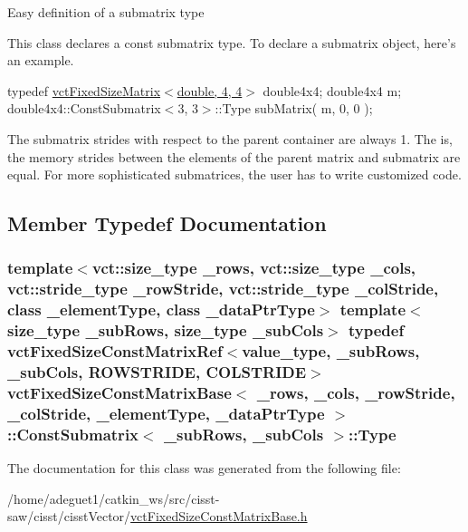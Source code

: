 Easy definition of a submatrix type

This class declares a const submatrix type. To declare a submatrix object, here's an example.

typedef \hyperlink{classvct_fixed_size_matrix}{vct\-Fixed\-Size\-Matrix$<$double, 4, 4$>$} double4x4; double4x4 m; double4x4\-::\-Const\-Submatrix$<$3, 3$>$\-::\-Type sub\-Matrix( m, 0, 0 );

The submatrix strides with respect to the parent container are always 1. The is, the memory strides between the elements of the parent matrix and submatrix are equal. For more sophisticated submatrices, the user has to write customized code. 

\subsection{Member Typedef Documentation}
\hypertarget{classvct_fixed_size_const_matrix_base_1_1_const_submatrix_a274c4b7ec1c81155c412da08ab1e1f41}{
\subsubsection[{Type}]{\setlength{\rightskip}{0pt plus 5cm}template$<$vct\-::size\-\_\-type \-\_\-rows, vct\-::size\-\_\-type \-\_\-cols, vct\-::stride\-\_\-type \-\_\-row\-Stride, vct\-::stride\-\_\-type \-\_\-col\-Stride, class \-\_\-element\-Type, class \-\_\-data\-Ptr\-Type$>$ template$<$size\-\_\-type \-\_\-sub\-Rows, size\-\_\-type \-\_\-sub\-Cols$>$ typedef {\bf vct\-Fixed\-Size\-Const\-Matrix\-Ref}$<$value\-\_\-type, \-\_\-sub\-Rows, \-\_\-sub\-Cols, {\bf R\-O\-W\-S\-T\-R\-I\-D\-E}, {\bf C\-O\-L\-S\-T\-R\-I\-D\-E}$>$ {\bf vct\-Fixed\-Size\-Const\-Matrix\-Base}$<$ \-\_\-rows, \-\_\-cols, \-\_\-row\-Stride, \-\_\-col\-Stride, \-\_\-element\-Type, \-\_\-data\-Ptr\-Type $>$\-::{\bf Const\-Submatrix}$<$ \-\_\-sub\-Rows, \-\_\-sub\-Cols $>$\-::{\bf Type}}}\label{classvct_fixed_size_const_matrix_base_1_1_const_submatrix_a274c4b7ec1c81155c412da08ab1e1f41}


The documentation for this class was generated from the following file\-:\begin{DoxyCompactItemize}
\item 
/home/adeguet1/catkin\-\_\-ws/src/cisst-\/saw/cisst/cisst\-Vector/\hyperlink{vct_fixed_size_const_matrix_base_8h}{vct\-Fixed\-Size\-Const\-Matrix\-Base.\-h}\end{DoxyCompactItemize}

